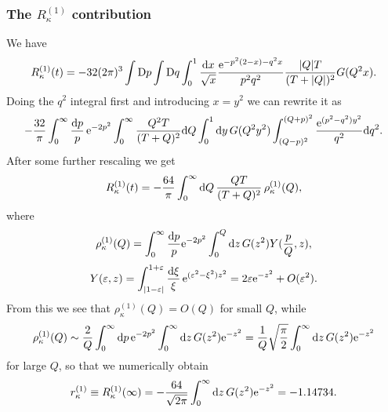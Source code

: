 \documentclass[preprint]{ptephy_v1}%
\newcommand{\rme}{{\rm e}}
\newcommand{\rmd}{{\rm d}}
\newcommand{\rmD}{{\rm D}}
\begin{document}
\subsubsection{The $R_\kappa^{(1)}$ contribution}
We have
\begin{equation}
R^{(1)}_\kappa(t)=-32(2\pi)^3\int \rmD p\int \rmD q\int_0^1\frac{\rmd x}{\sqrt{x}}
\frac{\rme^{-p^2(2-x)-q^2x}}{p^2q^2}\frac{|Q|T}{(T+|Q|)^2}G(Q^2x).
\end{equation}
Doing the $q^2$ integral first and introducing $x=y^2$ we can rewrite it as
\begin{equation}
-\frac{32}{\pi}\int_0^\infty\frac{\rmd p}{p}\, \rme^{-2p^2}\int_0^\infty
\frac{Q^2T}{(T+Q)^2}\rmd Q\int_0^1\rmd y\, G(Q^2y^2)
\int_{(Q-p)^2}^{(Q+p)^2}\frac{\rme^{(p^2-q^2)y^2}}{q^2}\rmd q^2.
\end{equation}
After some further rescaling we get
\begin{equation}
R^{(1)}_\kappa(t)=-\frac{64}{\pi}\int_0^\infty\rmd Q\, \frac{QT}{(T+Q)^2}\,
\rho^{(1)}_\kappa(Q),  
\end{equation}
where
\begin{equation}
\rho^{(1)}_\kappa(Q)=\int_0^\infty\frac{\rmd p}{p}\rme^{-2p^2}
\int_0^Q\rmd z\, G(z^2)Y(\frac{p}{Q},z),
\end{equation}
\begin{equation}
Y(\varepsilon,z)=\int_{|1-\varepsilon|}^{1+\varepsilon}\frac{\rmd \xi}{\xi}\,
\rme^{(\varepsilon^2-\xi^2)z^2}=2\varepsilon\rme^{-z^2}+O(\varepsilon^2).
\end{equation}
From this we see that $\rho_\kappa^{(1)}(Q) = O(Q)$ for small $Q$, while 
\begin{equation}
\rho^{(1)}_\kappa(Q)\sim\frac{2}{Q}
\int_0^\infty\rmd p\, \rme^{-2p^2}\int_0^\infty
\rmd z\, G(z^2)
\rme^{-z^2}=\frac{1}{Q}\sqrt{\frac{\pi}{2}}\int_0^\infty\rmd z\,
G(z^2)\rme^{-z^2}      
\end{equation}
 for large $Q$,  so that  we numerically obtain 
\begin{equation}
r^{(1)}_\kappa \equiv R^{(1)}_\kappa(\infty)=-\frac{64}{\sqrt{2\pi}}\int_0^\infty\rmd z\, G(z^2)
\rme^{-z^2}=-1.14734.
\end{equation}
\end{document}
